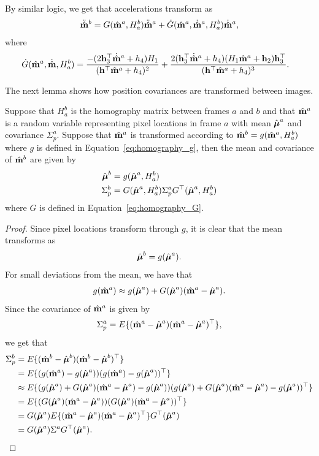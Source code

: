 By similar logic, we get that accelerations transform as
\[
\ddot{\hat{\mathbf{m}}}^b = G(\hat{\mathbf{m}}^a, H_a^b)\ddot{\hat{\mathbf{m}}}^a + \dot{G}(\hat{\mathbf{m}}^a, \dot{\hat{\mathbf{m}}}^a, H_a^b) \dot{\hat{\mathbf{m}}}^a,
\]
where 
\begin{align*}
\dot{G}(\hat{\mathbf{m}}^a, \dot{\hat{\mathbf{m}}}, H_a^b) &= \frac{-(2\mathbf{h}_3^\top\dot{\hat{\mathbf{m}}}^a + h_4)H_1}{(\mathbf{h}^\top\hat{\mathbf{m}}^a + h_4)^2} + \frac{2(\mathbf{h}_3^\top\dot{\hat{\mathbf{m}}}^a+h_4)(H_1\hat{\mathbf{m}}^a+\mathbf{h}_2)\mathbf{h}_3^\top}{(\mathbf{h}^\top\hat{\mathbf{m}}^a + h_4)^3}.
\end{align*}

The next lemma shows how position covariances are transformed between images.
\begin{lemma}
	Suppose that $H_a^b$ is the homography matrix between frames $a$ and $b$ and that $\hat{\mathbf{m}}^a$ is a random variable representing pixel locations in frame $a$ with mean $\hat{\boldsymbol{\mu}}^a$ and covariance $\Sigma_p^a$. Suppose that $\hat{\mathbf{m}}^a$ is transformed according to $\hat{\mathbf{m}}^b = g(\hat{\mathbf{m}}^a, H_a^b)$ where $g$ is defined in Equation~\eqref{eq:homography_g}, then the mean and covariance of $\hat{\mathbf{m}}^b$ are given by
	\begin{align*}
	\hat{\boldsymbol{\mu}}^b &= g(\hat{\boldsymbol{\mu}}^a, H_a^b) \\
	\Sigma_p^b &= G(\hat{\boldsymbol{\mu}}^a, H_a^b) \Sigma_p^a G^\top(\hat{\boldsymbol{\mu}}^a,H_a^b)
	\end{align*}
	where $G$ is defined in Equation~\eqref{eq:homography_G}.
\end{lemma}
\begin{proof}
	Since pixel locations transform through $g$, it is clear that the mean transforms as
	\[
	\hat{\boldsymbol{\mu}}^b = g(\hat{\boldsymbol{\mu}}^a).
	\]
	For small deviations from the mean, we have that
	\[
	g(\hat{\mathbf{m}}^a) \approx g(\hat{\boldsymbol{\mu}}^a) + G(\hat{\boldsymbol{\mu}}^a)(\hat{\mathbf{m}}^a - \hat{\boldsymbol{\mu}}^a).
	\]
	Since the covariance of $\hat{\mathbf{m}}^a$ is given by
	\[
	\Sigma_p^a = E\{(\hat{\mathbf{m}}^a-\hat{\boldsymbol{\mu}}^a)(\hat{\mathbf{m}}^a-\hat{\boldsymbol{\mu}}^{a})^\top\},
	\]
	we get that
	\begin{align*}
	\Sigma_p^b &= E\{(\hat{\mathbf{m}}^b-\hat{\boldsymbol{\mu}}^b)(\hat{\mathbf{m}}^b-\hat{\boldsymbol{\mu}}^{b})^\top\} \\
	&= E\{(g(\hat{\mathbf{m}}^a)-g(\hat{\boldsymbol{\mu}}^a))(g(\hat{\mathbf{m}}^a)-g(\hat{\boldsymbol{\mu}}^{a}))^\top\} \\
	&\approx E\{(g(\hat{\boldsymbol{\mu}}^a) + G(\hat{\boldsymbol{\mu}}^a)(\hat{\mathbf{m}}^a - \hat{\boldsymbol{\mu}}^a)-g(\hat{\boldsymbol{\mu}}^a))(g(\hat{\boldsymbol{\mu}}^a) + G(\hat{\boldsymbol{\mu}}^a)(\hat{\mathbf{m}}^a - \hat{\boldsymbol{\mu}}^a)-g(\hat{\boldsymbol{\mu}}^{a}))^\top\} \\
	&= E\{(G(\hat{\boldsymbol{\mu}}^a)(\hat{\mathbf{m}}^a - \hat{\boldsymbol{\mu}}^a))(G(\hat{\boldsymbol{\mu}}^a)(\hat{\mathbf{m}}^a - \hat{\boldsymbol{\mu}}^a))^\top\} \\
	&= G(\hat{\boldsymbol{\mu}}^a)E\{(\hat{\mathbf{m}}^a - \hat{\boldsymbol{\mu}}^a)(\hat{\mathbf{m}}^a - \hat{\boldsymbol{\mu}}^a)^\top\}G^\top(\hat{\boldsymbol{\mu}}^a) \\
	&= G(\hat{\boldsymbol{\mu}}^a)\Sigma^a G^\top(\hat{\boldsymbol{\mu}}^a).
	\end{align*}
\end{proof}

